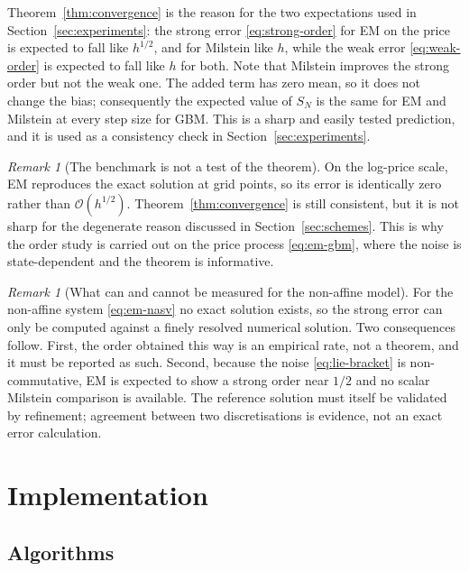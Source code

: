 \documentclass[11pt,a4paper]{article}
\theoremstyle{definition}
\theoremstyle{remark}
\newtheorem{remark}[theorem]{Remark}
\begin{document}
Theorem~\ref{thm:convergence} is the reason for the two expectations used in
Section~\ref{sec:experiments}: the strong error \eqref{eq:strong-order} for EM
on the price is expected to fall like $h^{1/2}$, and for Milstein like $h$,
while the weak error \eqref{eq:weak-order} is expected to fall like $h$ for
both. Note that Milstein improves the strong order but not the weak one. The
added term has zero mean, so it does not change the bias; consequently the
expected value of $S_N$ is the same for EM and Milstein at every step size for
GBM. This is a sharp and easily tested prediction, and it is used as a
consistency check in Section~\ref{sec:experiments}.

\begin{remark}[The benchmark is not a test of the theorem]
\label{rem:exact-on-log}
On the log-price scale, EM reproduces the exact solution at grid points, so its
error is identically zero rather than $\mathcal{O}(h^{1/2})$.
Theorem~\ref{thm:convergence} is still consistent, but it is not sharp for the
degenerate reason discussed in Section~\ref{sec:schemes}. This is why the order
study is carried out on the price process \eqref{eq:em-gbm}, where the noise is
state-dependent and the theorem is informative.
\end{remark}

\begin{remark}[What can and cannot be measured for the non-affine model]
\label{rem:empirical}
For the non-affine system \eqref{eq:em-nasv} no exact solution exists, so the
strong error can only be computed against a finely resolved numerical solution.
Two consequences follow. First, the order obtained this way is an empirical
rate, not a theorem, and it must be reported as such. Second, because the noise
\eqref{eq:lie-bracket} is non-commutative, EM is expected to show a strong
order near $1/2$ and no scalar Milstein comparison is available. The reference
solution must itself be validated by refinement; agreement between two
discretisations is evidence, not an exact error calculation.
\end{remark}

\newpage
\section{Implementation}
\label{sec:implementation}

\subsection{Algorithms}
\label{sec:algorithms}
\end{document}
